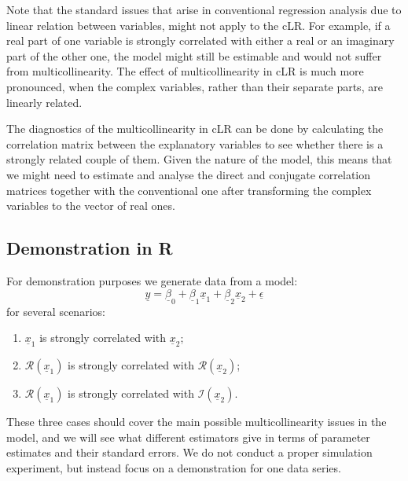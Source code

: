 \documentclass[
]{book}
\providecommand{\tightlist}{%
  \setlength{\itemsep}{0pt}\setlength{\parskip}{0pt}}
\begin{document}
Note that the standard issues that arise in conventional regression analysis due to linear relation between variables, might not apply to the cLR. For example, if a real part of one variable is strongly correlated with either a real or an imaginary part of the other one, the model might still be estimable and would not suffer from multicollinearity. The effect of multicollinearity in cLR is much more pronounced, when the complex variables, rather than their separate parts, are linearly related.

The diagnostics of the multicollinearity in cLR can be done by calculating the correlation matrix between the explanatory variables to see whether there is a strongly related couple of them. Given the nature of the model, this means that we might need to estimate and analyse the direct and conjugate correlation matrices together with the conventional one after transforming the complex variables to the vector of real ones.

\hypertarget{demonstration-in-r-3}{%
\subsection{Demonstration in R}\label{demonstration-in-r-3}}

For demonstration purposes we generate data from a model:
\begin{equation*}
    \underline{y} = \underline{\beta}_0 + \underline{\beta}_1 \underline{x}_{1} + \underline{\beta}_2 \underline{x}_{2} + \underline{\epsilon}
\end{equation*}
for several scenarios:

\begin{enumerate}
\def\labelenumi{\arabic{enumi}.}
\tightlist
\item
  \(\underline{x}_{1}\) is strongly correlated with \(\underline{x}_{2}\);
\item
  \(\mathcal{R}\left(\underline{x}_{1}\right)\) is strongly correlated with \(\mathcal{R}\left(\underline{x}_{2}\right)\);
\item
  \(\mathcal{R}\left(\underline{x}_{1}\right)\) is strongly correlated with \(\mathcal{I}\left(\underline{x}_{2}\right)\).
\end{enumerate}

These three cases should cover the main possible multicollinearity issues in the model, and we will see what different estimators give in terms of parameter estimates and their standard errors. We do not conduct a proper simulation experiment, but instead focus on a demonstration for one data series.
\end{document}
